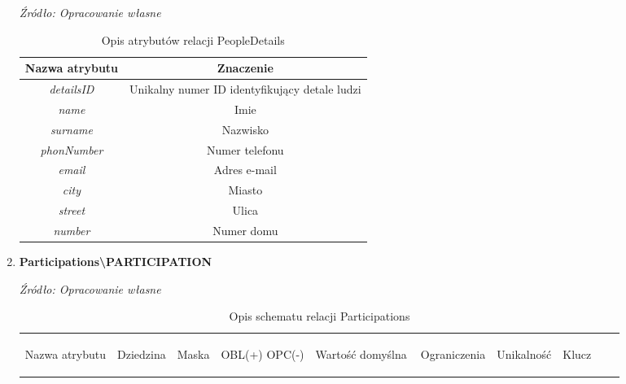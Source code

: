\documentclass[12pt,oneside]{report}
\begin{document}
\begin{enumerate}[start=10,label={\bfseries REL\textbackslash\arabic*}]
	\begin{table}[H]
		\caption{Opis atrybutów relacji PeopleDetails}
		\textit{Źródło: Opracowanie własne}
		\label{PeopleDetailsAttributeDescription}
		\centering
		\begin{tabular}{|c|c|}
			\hline
			Nazwa atrybutu & Znaczenie \\
			\hline			
			\textit{detailsID}& Unikalny numer ID identyfikujący detale ludzi\\	
			\hline			
			\textit{name}& Imie \\	
			\hline			
			\textit{surname}& Nazwisko\\	
			\hline			
			\textit{phonNumber}& Numer telefonu\\	
			\hline			
			\textit{email}& Adres e-mail\\	
			\hline			
			\textit{city}& Miasto \\	
			\hline			
			\textit{street}& Ulica\\	
			\hline			
			\textit{number}& Numer domu\\	
			\hline
		\end{tabular}
	\end{table}
\newpage
	\item \textbf{Participations\textbackslash PARTICIPATION} 
	\begin{table}[H]
		\caption{Opis schematu relacji Participations}
		\textit{Źródło: Opracowanie własne}
		\label{ParticipationsRelationSchema}
		\centering
		\begin{tabular}{|c|c|c|c|c|c|c|c|c|c|}
			\hline
			\begin{sideways}Nazwa atrybutu\end{sideways}& 
			\begin{sideways}Dziedzina \end{sideways}& 
			\begin{sideways}Maska \end{sideways}& 
			\begin{sideways}OBL(+) OPC(-)\end{sideways} & 
			\begin{sideways}Wartość domyślna$\ $\end{sideways}& 
			\begin{sideways}Ograniczenia\end{sideways} &
			\begin{sideways}Unikalność \end{sideways}& 
			\begin{sideways}Klucz \end{sideways}& 

\end{tabular}
\end{table}
\end{enumerate}
\end{document}
